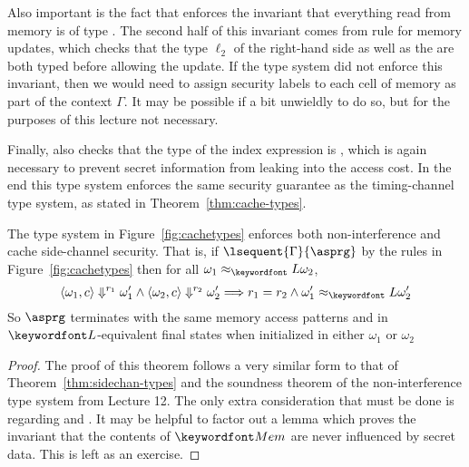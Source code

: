 \documentclass[11pt,twoside]{scrartcl}
\begin{document}
Also important is the fact that  enforces the invariant that everything read from memory is of type \lowsec. The second half of this invariant comes from rule  for memory updates, which checks that the type $\ell_2$ of the right-hand side as well as the \pc are both typed \lowsec before allowing the update. If the type system did not enforce this invariant, then we would need to assign security labels to each cell of memory as part of the context $\Gamma$. It may be possible if a bit unwieldly to do so, but for the purposes of this lecture not necessary.

Finally,  also checks that the type of the index expression is \lowsec, which is again necessary to prevent secret information from leaking into the access cost. In the end this type system enforces the same security guarantee as the timing-channel type system, as stated in Theorem~\ref{thm:cache-types}.

\begin{theorem}
\label{thm:cache-types}
The type system in Figure~\ref{fig:cachetypes} enforces both non-interference and cache side-channel security. That is, if $\lsequent{\Gamma}{\asprg}$ by the rules in Figure~\ref{fig:cachetypes} then for all $\omega_1\approx_\lowt\omega_2$, 
\[
\langle \omega_1, c\rangle \Downarrow^{r_1} \omega_1' \land \langle\omega_2, c\rangle\Downarrow^{r_2}\omega_2' \Longrightarrow r_1 = r_2 \land \omega_1' \approx_\lowt \omega_2'
\]
So $\asprg$ terminates with the same memory access patterns and in $\lowsec$-equivalent final states when initialized in either $\omega_1$ or $\omega_2$
\end{theorem}
\begin{proof}
The proof of this theorem follows a very similar form to that of Theorem~\ref{thm:sidechan-types} and the soundness theorem of the non-interference type system from Lecture 12. The only extra consideration that must be done is regarding  and . It may be helpful to factor out a lemma which proves the invariant that the contents of $\pderefop$ are never influenced by secret data. This is left as an exercise.
\end{proof}



\end{document}
